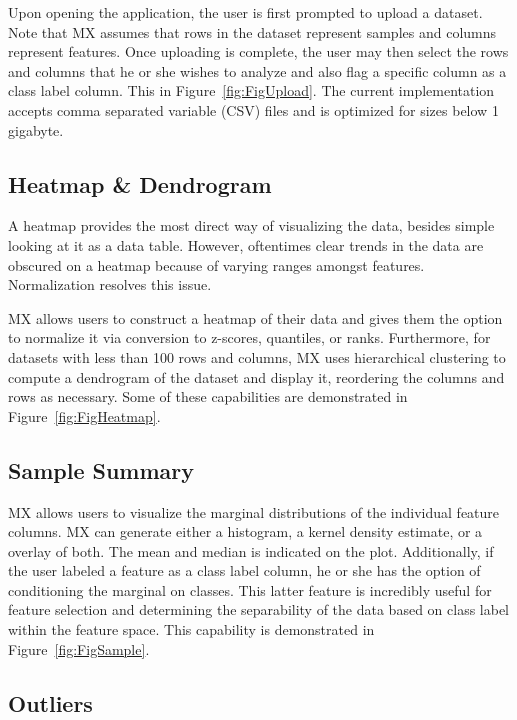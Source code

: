 \documentclass[12pt]{article}
\begin{document}
Upon opening the application, the user is first prompted to upload a dataset. Note that MX assumes that rows in the dataset represent samples and columns represent features. Once uploading is complete, the user may then select the rows and columns that he or she wishes to analyze and also flag a specific column as a class label column. This in Figure~\ref{fig:FigUpload}. The current implementation accepts comma separated variable (CSV) files and is optimized for sizes below 1 gigabyte.

\subsection{Heatmap \& Dendrogram}
\label{subsec:SubSecHeatmap}

A heatmap provides the most direct way of visualizing the data, besides simple looking at it as a data table. However, oftentimes clear trends in the data are obscured on a heatmap because of varying ranges amongst features. Normalization resolves this issue.

MX allows users to construct a heatmap of their data and gives them the option to normalize it via conversion to z-scores, quantiles, or ranks. Furthermore, for datasets with less than 100 rows and columns, MX uses hierarchical clustering to compute a dendrogram of the dataset and display it, reordering the columns and rows as necessary. Some of these capabilities are demonstrated in Figure~\ref{fig:FigHeatmap}. 

\subsection{Sample Summary}
\label{subsec:SubSecSample}

MX allows users to visualize the marginal distributions of the individual feature columns. MX can generate either a histogram, a kernel density estimate, or a overlay of both. The mean and median is indicated on the plot. Additionally, if the user labeled a feature as a class label column, he or she has the option of conditioning the marginal on classes. This latter feature is incredibly useful for feature selection and determining the separability of the data based on class label within the feature space. This capability is demonstrated in Figure~\ref{fig:FigSample}. 

\subsection{Outliers}
\label{subsec:SubSecOutliers}
\end{document}
